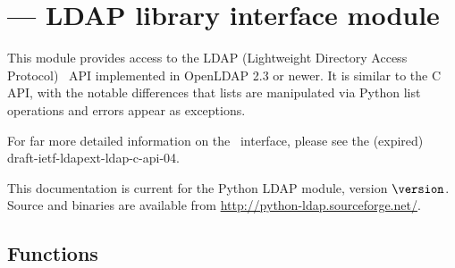 

\section{ --- LDAP library interface module}






This module provides access to the LDAP
(Lightweight Directory Access Protocol) \C\ API implemented
in OpenLDAP 2.3 or newer.
It is similar to the C API, with the notable differences
that lists are manipulated via Python
list operations and errors appear as exceptions.

For far more detailed information on the \C\ interface, 
please see the (expired) draft-ietf-ldapext-ldap-c-api-04.

This documentation is current for the Python LDAP module, version
$\version$.
Source and binaries are available from
\url{http://python-ldap.sourceforge.net/}.


\subsection{Functions}

